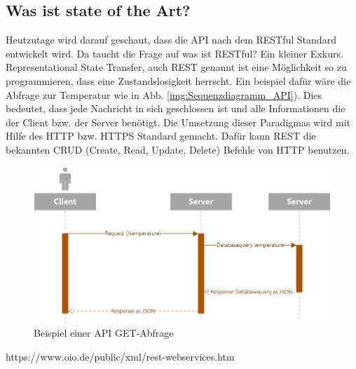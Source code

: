\subsection{Was ist state of the Art?}
Heutzutage wird darauf geschaut, dass die API nach dem RESTful Standard entwickelt wird. Da taucht die Frage auf was ist RESTful? Ein kleiner Exkurs. Representational State Transfer, auch REST genannt ist eine Möglichkeit so zu programmieren, dass eine Zustandslosigkeit herrscht. Ein beispiel dafür wäre die Abfrage zur Temperatur wie in Abb. \ref{img:Sequenzdiagramm_API}).  Dies bedeutet, dass jede Nachricht in sich geschlossen ist und alle Informationen die der Client bzw. der Server benötigt. Die Umsetzung dieser Paradigmas wird mit Hilfe des HTTP bzw. HTTPS Standard gemacht. Dafür kann REST die bekannten CRUD (Create, Read, Update, Delete) Befehle von HTTP benutzen.\\
\begin{figure}[h!]
	\centering
	\includegraphics[width=1\linewidth]{img/Sequenzdiagramm_API}
	\caption{Beispiel einer API GET-Abfrage}
	\label{img:wetterstation}
\end{figure}

https://www.oio.de/public/xml/rest-webservices.htm

